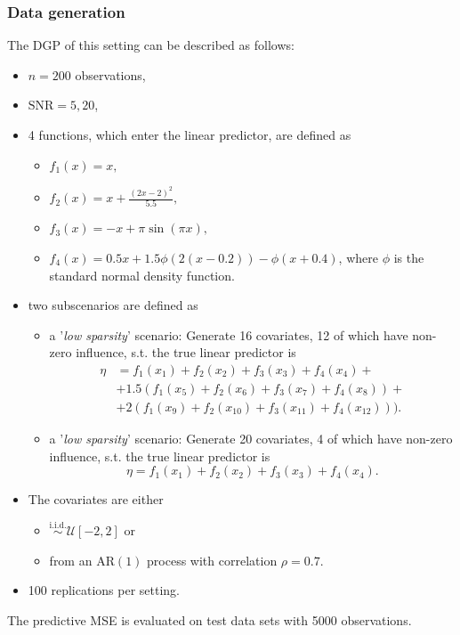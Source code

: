 \documentclass[12pt,letterpaper]{article}
\numberwithin{equation}{subsection}
\begin{document}
\subsubsection{Data generation}
The DGP of this setting can be described as follows:
\begin{itemize}
\item $n = 200$ observations,
\item $\text{SNR} = 5, 20$,
\item 4 functions, which enter the linear predictor, are defined as
\begin{itemize}
\item $f_1(x) = x,$
\item $f_2(x) = x + \frac{(2x-2)^2}{5.5},$
\item $f_3(x) = -x + \pi\sin(\pi x),$
\item $f_4(x) = 0.5x + 1.5\phi(2(x-0.2))-\phi(x+0.4)$, where $\phi$ is the standard normal density function.
\end{itemize}
\item two subscenarios are defined as
\begin{itemize}
\item a '\textit{low sparsity}' scenario: Generate 16 covariates, 12 of which have non-zero influence, s.t. the true linear predictor is 
\begin{align*}
\eta & = f_1(x_1) + f_2(x_2) + f_3(x_3) + f_4(x_4) + \\
& + 1.5( f_1(x_5) + f_2(x_6) + f_3(x_7) + f_4(x_8)) + \\ 
& + 2(f_1(x_9) + f_2(x_{10}) + f_3(x_{11}) + f_4(x_{12})) ).
\end{align*}
\item a '\textit{low sparsity}' scenario: Generate 20 covariates, 4 of which have non-zero influence, s.t. the true linear predictor is 
\begin{equation*}
\eta = f_1(x_1) + f_2(x_2) + f_3(x_3) + f_4(x_4). 
\end{equation*}
\end{itemize}
\item The covariates are either 
\begin{itemize}
\item $\overset{\text{i.i.d.}}{\sim} \mathcal{U}[-2,2]$ or 
\item from an $\text{AR}(1)$ process with correlation $\rho = 0.7$.
\end{itemize}
\item 100 replications per setting.
\end{itemize}
The predictive MSE is evaluated on test data sets with 5000 observations.
\label{sec:sfdgp}
\end{document}
